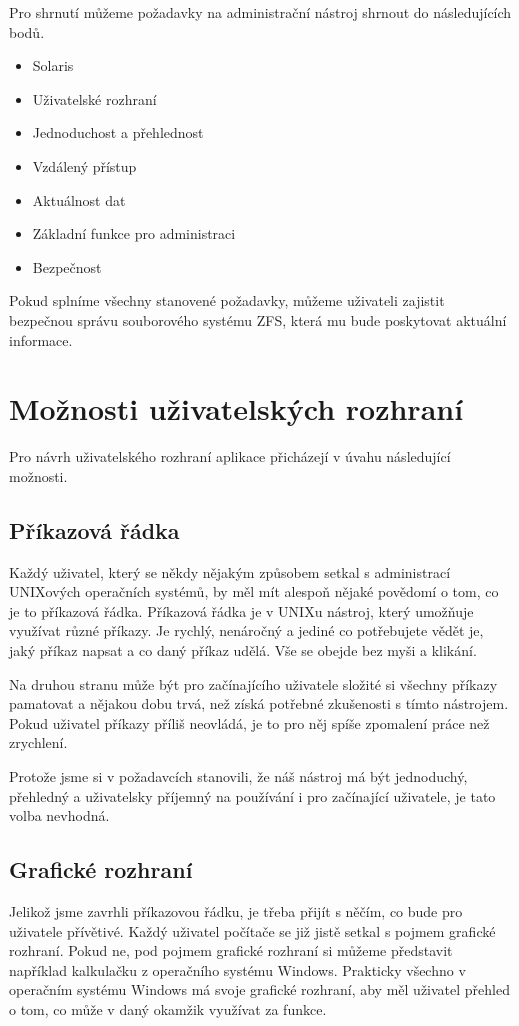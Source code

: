 Pro shrnutí můžeme požadavky na administrační nástroj shrnout do následujících bodů.
\begin{itemize}
    \item Solaris
    \item Uživatelské rozhraní
    \item Jednoduchost a přehlednost
    \item Vzdálený přístup
    \item Aktuálnost dat
    \item Základní funkce pro administraci
    \item Bezpečnost
\end{itemize}

Pokud splníme všechny stanovené požadavky, můžeme uživateli zajistit bezpečnou správu souborového systému ZFS, která mu bude poskytovat aktuální informace.
\section{Možnosti uživatelských rozhraní}
Pro návrh uživatelského rozhraní aplikace přicházejí v úvahu následující možnosti.
    \subsection{Příkazová řádka}
    Každý uživatel, který se někdy nějakým způsobem setkal s administrací UNIXových operačních systémů, by měl mít alespoň nějaké povědomí o tom, co je to příkazová řádka. Příkazová řádka je v UNIXu nástroj, který umožňuje využívat různé příkazy. Je rychlý, nenáročný a jediné co potřebujete vědět je, jaký příkaz napsat a co daný příkaz udělá. Vše se obejde bez myši a klikání.

    Na druhou stranu může být pro začínajícího uživatele složité si všechny příkazy pamatovat a nějakou dobu trvá, než získá potřebné zkušenosti s tímto nástrojem. Pokud uživatel příkazy příliš neovládá, je to pro něj spíše zpomalení práce než zrychlení.

    Protože jsme si v požadavcích stanovili, že náš nástroj má být jednoduchý, přehledný a uživatelsky příjemný na používání i pro začínající uživatele, je tato volba nevhodná.
    \subsection{Grafické rozhraní}
    Jelikož jsme zavrhli příkazovou řádku, je třeba přijít s něčím, co bude pro uživatele přívětivé. Každý uživatel počítače se již jistě setkal s pojmem grafické rozhraní. Pokud ne, pod pojmem grafické rozhraní si můžeme představit například kalkulačku z operačního systému Windows. Prakticky všechno v operačním systému Windows má svoje grafické rozhraní, aby měl uživatel přehled o tom, co může v daný okamžik využívat za funkce.


